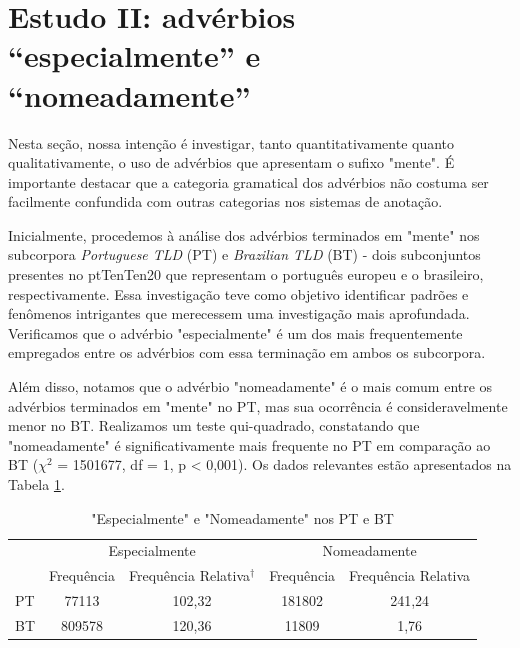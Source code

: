 \documentclass[portuguese]{textolivre}
\begin{document}
\section{Estudo II: advérbios “especialmente” e “nomeadamente”}

Nesta seção, nossa intenção é investigar, tanto quantitativamente quanto qualitativamente, o uso de advérbios que apresentam o sufixo "mente". É importante destacar que a categoria gramatical dos advérbios não costuma ser facilmente confundida com outras categorias nos sistemas de anotação.

Inicialmente, procedemos à análise dos advérbios terminados em "mente" nos subcorpora \textit{Portuguese TLD} (PT) e \textit{Brazilian TLD} (BT) - dois subconjuntos presentes no ptTenTen20 que representam o português europeu e o brasileiro, respectivamente. Essa investigação teve como objetivo identificar padrões e fenômenos intrigantes que merecessem uma investigação mais aprofundada. Verificamos que o advérbio "especialmente" é um dos mais frequentemente empregados entre os advérbios com essa terminação em ambos os subcorpora.

Além disso, notamos que o advérbio "nomeadamente" é o mais comum entre os advérbios terminados em "mente" no PT, mas sua ocorrência é consideravelmente menor no BT. Realizamos um teste qui-quadrado, constatando que "nomeadamente" é significativamente mais frequente no PT em comparação ao BT (\(\chi\)\(^2\) = 1501677, df = 1, p < 0,001). Os dados relevantes estão apresentados na Tabela \ref{tab9}.


\begin{table}[h]
\centering
\begin{threeparttable}
\caption{"Especialmente" e "Nomeadamente" nos PT e BT}
\label{tab9}
\begin{tabular}{lcccc}
\hline
\multirow{2}{*}{} & \multicolumn{2}{c}{Especialmente}                                                     & \multicolumn{2}{c}{Nomeadamente} \\ %
                  & Frequência & Frequência Relativa$^\dagger$ & Frequência & Frequência Relativa \\ 
		  \midrule
PT                & 77113      & 102,32                                                                   & 181802     & 241,24              \\ 
BT                & 809578     & 120,36                                                                   & 11809      & 1,76                \\ 
\bottomrule
\end{tabular}
\end{threeparttable}
\end{table}
\end{document}
